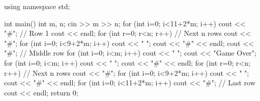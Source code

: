 \begin{enumerate}
\begin{enumerate}
\begin{cppcode}
			using namespace std;
			
			int main()
			{
				int m, n;
				cin >> m >> n;
				for (int i=0; i<11+2*m; i++) cout << "#"; // Row 1
				cout << endl;
				for (int r=0; r<n; r++) { // Next n rows
					cout << "#";
					for (int i=0; i<9+2*m; i++) cout << " ";
					cout << "#" << endl;
				}
				cout << "#"; // Middle row
				for (int i=0; i<m; i++) cout << " ";
				cout << "Game Over";
				for (int i=0; i<m; i++) cout << " ";
				cout << "#" << endl;
				for (int r=0; r<n; r++) { // Next n rows
					cout << "#";
					for (int i=0; i<9+2*m; i++) cout << " ";
					cout << "#" << endl;
				}
				for (int i=0; i<11+2*m; i++) cout << "#"; // Last row
				cout << endl;
				return 0;
			}
		
	\end{cppcode}
				
		\end{enumerate}
	
\end{enumerate}

